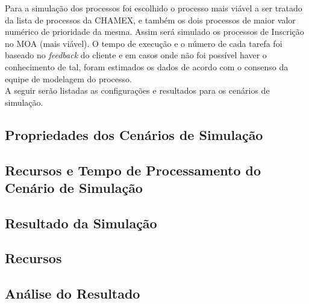 Para a simulação dos processos foi escolhido o processo mais viável a ser tratado da lista de processos da CHAMEX, e também os dois processos de maior valor numérico de prioridade da mesma. Assim será simulado os processos de Inscrição no MOA (mais viável). O tempo de execução e o número de cada tarefa foi baseado no \emph{feedback} do cliente e em casos onde não foi possível haver o conhecimento de tal, foram estimados os dados de acordo com o consenso da equipe de modelagem do processo.
\\ A seguir serão listadas as configurações e resultados para os cenários de simulação.

\subsection[Propriedades dos Cenários de Simulação]{Propriedades dos Cenários de Simulação}
\label{subsec:contexto_asis_cenarios}
	

\subsection[Recursos e Tempo de Processamento do Cenário de Simulação]{Recursos e Tempo de Processamento do Cenário de Simulação}
\label{subsec:contexto_asis_tempo}
	

\subsection[Resultado da Simulação]{Resultado da Simulação}
\label{subsec:contexto_asis_resultado}
	

\subsection[Recursos]{Recursos}
\label{subsec:contexto_asis_recursos}
	

\subsection[Análise do Resultado]{Análise do Resultado}
\label{subsec:contexto_asis_analise}
	